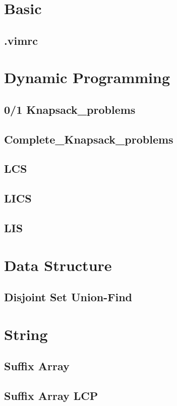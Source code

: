 \section{Basic}
    \subsection{.vimrc}
        

\section{Dynamic Programming}
    \subsection{0/1 Knapsack\_problems}
        
    \subsection{Complete\_Knapsack\_problems}
        
    \subsection{LCS}
        
    \subsection{LICS}
        
    \subsection{LIS}
        

\section{Data Structure}
    \subsection{Disjoint Set Union-Find}
        

\section{String}
    \subsection{Suffix Array}
        
    \subsection{Suffix Array LCP}
        

    